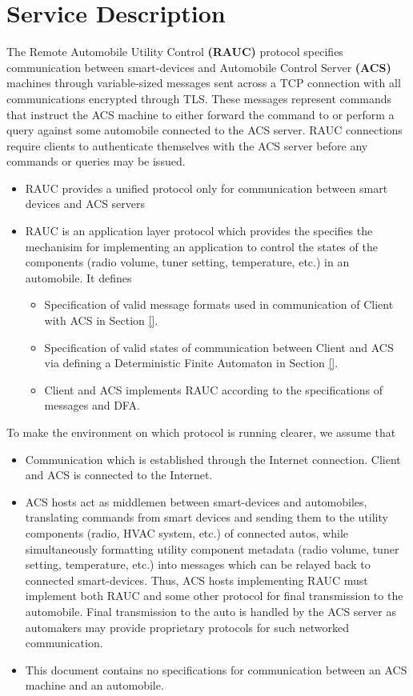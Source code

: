 
\section{Service Description}
\label{sec:serv_desc}

The Remote Automobile Utility Control \textbf{(RAUC)} protocol specifies communication between smart-devices and Automobile Control Server \textbf{(ACS)} machines through variable-sized messages sent across a TCP connection with all communications encrypted through TLS. These messages represent commands that instruct the ACS machine to either forward the command to or perform a query against some automobile connected to the ACS server. RAUC connections require clients to authenticate themselves with the ACS server before any commands or queries may be issued.
\begin{itemize}
\item  RAUC provides a unified protocol only for communication between smart devices and ACS servers
\item RAUC is  an application layer protocol which provides the specifies the mechanisim for implementing an application to control the states of the components (radio volume, tuner setting, temperature, etc.) in an automobile. It defines 
\begin{itemize}
\item Specification of valid message formats used in communication of Client with ACS in Section \ref{}.
\item Specification of valid states of communication between Client and ACS via defining a Deterministic Finite Automaton in Section \ref{}. 
\item Client and ACS implements RAUC according to the specifications of messages and DFA.
\end{itemize}
\end{itemize}

To make the environment on which protocol is running clearer, we assume that 
\begin{itemize}
\item Communication which is established through the Internet connection. Client and ACS is connected to the Internet.
\item ACS hosts act as middlemen between smart-devices and automobiles, translating commands from smart devices and sending them to the utility components (radio, HVAC system, etc.) of connected autos, while simultaneously formatting utility component metadata (radio volume, tuner setting, temperature, etc.) into messages which can be relayed back to connected smart-devices.  Thus, ACS hosts implementing RAUC must implement both RAUC and some other protocol for final transmission to the automobile. Final transmission to the auto is handled by the ACS server as automakers may provide proprietary protocols for such networked communication. 
\item This document contains no specifications for communication between an ACS machine and an automobile.
\end{itemize}


